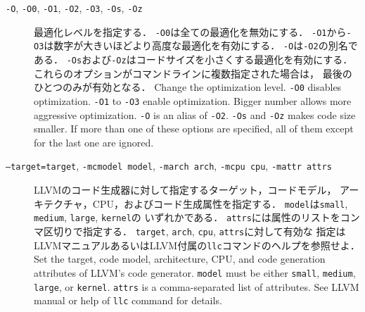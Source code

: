 \documentclass{jbook}
\newcommand{\term}[1]{\mbox{{\tt #1}}}
\begin{document}
\begin{description}
\item[{\tt -O},
      {\tt -O0},
      {\tt -O1},
      {\tt -O2},
      {\tt -O3},
      {\tt -Os},
      {\tt -Oz}]
\ifjp%
	最適化レベルを指定する．
        {\tt -O0}は全ての最適化を無効にする．
	{\tt -O1}から{\tt -O3}は数字が大きいほどより高度な最適化を有効にする．
        {\tt -O}は{\tt -O2}の別名である．
	{\tt -Os}および{\tt -Oz}はコードサイズを小さくする最適化を有効にする．
	これらのオプションがコマンドラインに複数指定された場合は，
最後のひとつのみが有効となる．
\else%
        Change the optimization level.
	{\tt -O0} disables optimization.
	{\tt -O1} to {\tt -O3} enable optimization.
	Bigger number allows more aggressive optimization.
	{\tt -O} is an alias of {\tt -O2}.
	{\tt -Os} and {\tt -Oz} makes code size smaller.
	If more than one of these options are specified, all of them
except for the last one are ignored.
\fi%

\item[{\tt --target=\term{target}},
      {\tt -mcmodel \term{model}},
      {\tt -march \term{arch}},
      {\tt -mcpu \term{cpu}},
      {\tt -mattr \term{attrs}}]
\ifjp%
	LLVMのコード生成器に対して指定するターゲット，コードモデル，
アーキテクチャ，CPU，およびコード生成属性を指定する．
	\term{model}は{\tt small}, {\tt medium}, {\tt large}, {\tt kernel}の
いずれかである．
	\term{attrs}には属性のリストをコンマ区切りで指定する．
	\term{target}, \term{arch}, \term{cpu}, \term{attrs}に対して有効な
指定はLLVMマニュアルあるいはLLVM付属の{\tt llc}コマンドのヘルプを参照せよ．
\else%
	Set the target, code model, architecture, CPU, and code generation
attributes of LLVM's code generator.
	\term{model} must be either
{\tt small}, {\tt medium}, {\tt large}, or {\tt kernel}.
	\term{attrs} is a comma-separated list of attributes.
        See LLVM manual or help of {\tt llc} command for details.
\fi%


\end{description}
\end{document}
